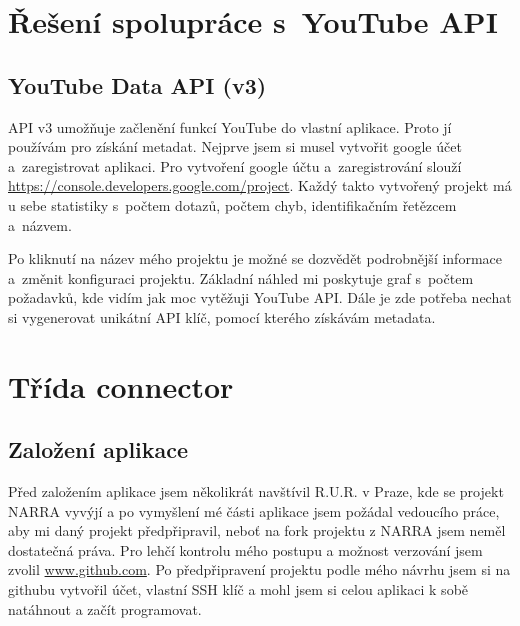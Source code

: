 \section{Řešení spolupráce s~YouTube API}
\subsection{YouTube Data API (v3)}
\par API v3 umožňuje začlenění funkcí YouTube do vlastní aplikace. Proto jí používám pro získání metadat. Nejprve jsem si musel vytvořit google účet a~zaregistrovat aplikaci. Pro vytvoření google účtu a~zaregistrování slouží \url{https://console.developers.google.com/project}. Každý takto vytvořený projekt má u sebe statistiky s~počtem dotazů, počtem chyb, identifikačním řetězcem a~názvem. 
\par Po kliknutí na název mého projektu je možné se dozvědět podrobnější informace a~změnit konfiguraci projektu. Základní náhled mi poskytuje graf s~počtem požadavků, kde vidím jak moc vytěžuji YouTube API. Dále je zde potřeba nechat si vygenerovat unikátní API klíč, pomocí kterého získávám metadata.

\section{Třída connector}
\subsection{Založení aplikace}
\par Před založením aplikace jsem několikrát navštívil R.U.R. v Praze, kde se projekt NARRA vyvýjí a po vymyšlení mé části aplikace jsem požádal vedoucího práce, aby mi daný projekt předpřipravil, neboť na fork projektu z NARRA jsem neměl dostatečná práva. Pro lehčí kontrolu mého postupu a možnost verzování jsem zvolil \url{www.github.com}. Po předpřipravení projektu podle mého návrhu jsem si na githubu vytvořil účet, vlastní SSH klíč a mohl jsem si celou aplikaci k sobě natáhnout a začít programovat.

